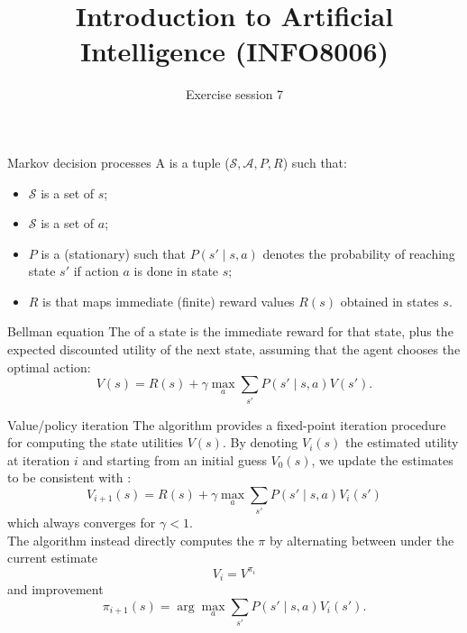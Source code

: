 \documentclass[11pt, a4paper]{article}
\title{Introduction to Artificial Intelligence (INFO8006)}
\subtitle{Exercise session 7}
\begin{document}
\maketitle

\begin{thbox}{Markov decision processes}
    A  is a tuple ($\mathcal{S}, \mathcal{A}, P, R$) such that:
    \begin{itemize}
        \item $\mathcal{S}$ is a set of  $s$;
        \item $\mathcal{S}$ is a set of  $a$;
        \item $P$ is a (stationary)  such that $P(s'\mid s,a)$ denotes the probability of reaching state $s'$ if action $a$ is done in state $s$;
        \item $R$ is  that maps immediate (finite) reward values $R(s)$ obtained in states $s$.
    \end{itemize}
\end{thbox}

\begin{thbox}{Bellman equation}
    The  of a state is the immediate reward for that state, plus the expected discounted utility of the next state, assuming that the agent chooses the optimal action:
    $$
    V(s) = R(s) + \gamma \max_a\sum_{s'}P(s'\mid s,a)V(s').
    $$
\end{thbox}

\begin{thbox}{Value/policy iteration}
    The  algorithm provides a fixed-point iteration procedure for computing the state utilities $V(s)$. By denoting $V_i(s)$ the estimated utility at iteration $i$ and starting from an initial guess $V_0(s)$, we update the estimates to be consistent with :
    $$
    V_{i+1}(s) = R(s) + \gamma \max_a\sum_{s'}P(s'\mid s,a)V_i(s')
    $$
    which always converges for $\gamma < 1$.\\

    The  algorithm instead directly computes the  $\pi$ by alternating between  under the current  estimate
    $$
    V_i = V^{\pi_i}
    $$
    and  improvement
    $$
    \pi_{i+1}(s) = \arg \max_a \sum_{s'}P(s' \mid s,a) V_i(s').
    $$
\end{thbox}
\end{document}
